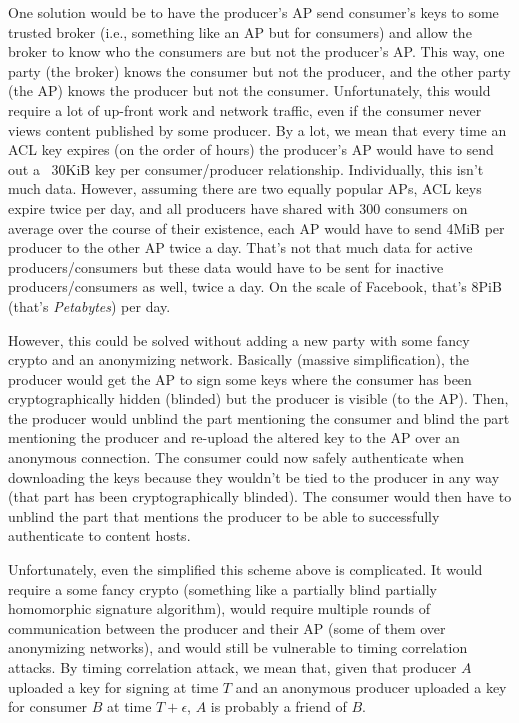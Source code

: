 \documentclass[pdftex,12pt,a4papaer,twoside,notitlepage]{report}
\begin{document}
One solution would be to have the producer's AP send consumer's keys to some
trusted broker (i.e., something like an AP but for consumers) and allow the
broker to know who the consumers are but not the producer's AP. This way, one
party (the broker) knows the consumer but not the producer, and the other party
(the AP) knows the producer but not the consumer. Unfortunately, this would
require a lot of up-front work and network traffic, even if the consumer never
views content published by some producer. By a lot, we mean that every time an
ACL key expires (on the order of hours) the producer's AP would have to send out
a ~30KiB key per consumer/producer relationship. Individually, this isn't much
data. However, assuming there are two equally popular APs, ACL keys expire twice
per day, and all producers have shared with 300 consumers on average over the
course of their existence, each AP would have to send 4MiB per producer to the
other AP twice a day. That's not that much data for active producers/consumers
but these data would have to be sent for inactive producers/consumers as well,
twice a day. On the scale of Facebook, that's 8PiB (that's \emph{Petabytes}) per
day.

However, this could be solved without adding a new party with some fancy crypto
and an anonymizing network. Basically (massive simplification), the producer
would get the AP to sign some keys where the consumer has been cryptographically
hidden (blinded) but the producer is visible (to the AP). Then, the producer
would unblind the part mentioning the consumer and blind the part mentioning the
producer and re-upload the altered key to the AP over an anonymous connection.
The consumer could now safely authenticate when downloading the keys because
they wouldn't be tied to the producer in any way (that part has been
cryptographically blinded). The consumer would then have to unblind the part
that mentions the producer to be able to successfully authenticate to content
hosts.

Unfortunately, even the simplified this scheme above is complicated. It would
require a some fancy crypto (something like a partially blind partially
homomorphic signature algorithm), would require multiple rounds of communication
between the producer and their AP (some of them over anonymizing networks), and
would still be vulnerable to timing correlation attacks. By timing correlation
attack, we mean that, given that producer $A$ uploaded a key for signing at time
$T$ and an anonymous producer uploaded a key for consumer $B$ at time
$T+\epsilon$, $A$ is probably a friend of $B$.
\end{document}
